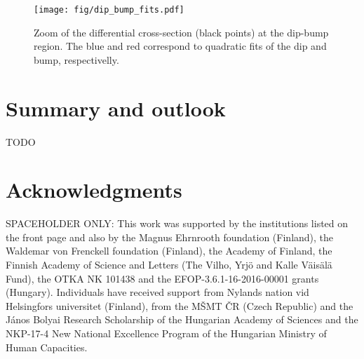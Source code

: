\documentclass[doublecol]{epl/epl2}
\begin{document}
\begin{figure}
\begin{center}
\texttt{[image: fig/dip\_bump\_fits.pdf]}
\vskip-5mm
\caption{Zoom of the differential cross-section (black points) at the dip-bump region. The blue and red correspond to quadratic fits of the dip and bump, respectivelly.}
\label{f:dip bump fits}
\end{center}
\end{figure}


\section{Summary and outlook}
\label{s:summary}

TODO


\section{Acknowledgments}

SPACEHOLDER ONLY: This work was supported by the institutions listed on the front page and also by the Magnus Ehrnrooth foundation (Finland), the Waldemar von Frenckell foundation (Finland), the Academy of Finland, the Finnish Academy of Science and Letters (The Vilho, Yrj\"o and Kalle V\"ais\"al\"a Fund), the OTKA NK 101438 and the EFOP-3.6.1-16-2016-00001 grants (Hungary). Individuals have received support from Nylands nation vid Helsingfors universitet (Finland), from the M\v SMT \v CR (Czech Republic) and the J\'anos Bolyai Research Scholarship of the Hungarian Academy of Sciences and the NKP-17-4 New National Excellence Program of the Hungarian Ministry of Human Capacities.





\iffalse
\begin{thebibliography}{99}

\bibitem{epl95}
	\Name{Antchev G.~\etal{}~(TOTEM Collaboration)}
	\REVIEW{Europhys.~Lett.}{95}{2011}{41001}

\end{thebibliography}
\fi
\end{document}

